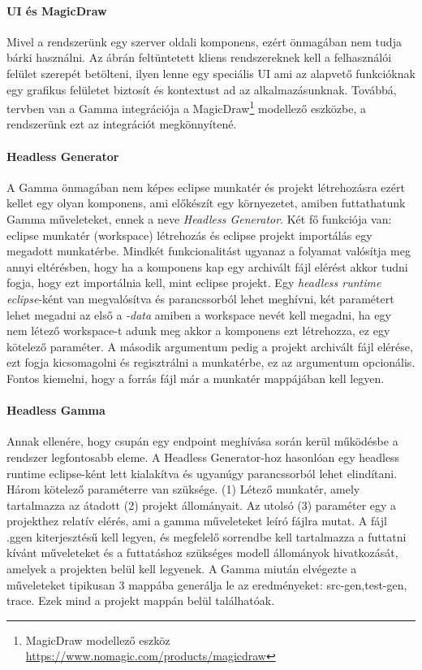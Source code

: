 \paragraph{UI és MagicDraw} Mivel a rendszerünk egy szerver oldali komponens, ezért önmagában nem tudja bárki használni. Az ábrán feltüntetett kliens rendszereknek kell a felhasználói felület szerepét betölteni, ilyen lenne egy speciális UI ami az alapvető funkcióknak egy grafikus felületet biztosít és kontextust ad az alkalmazásunknak. Továbbá, tervben van a Gamma integrációja a MagicDraw\footnote{MagicDraw modellező eszköz \url{https://www.nomagic.com/products/magicdraw}} modellező eszközbe, a rendszerünk ezt az integrációt megkönnyítené. 

\paragraph{Headless Generator} A Gamma önmagában nem képes eclipse munkatér és projekt létrehozásra ezért kellet egy olyan komponens, ami előkészít egy környezetet, amiben futtathatunk Gamma műveleteket, ennek a neve \textit{Headless Generator}. Két fő funkciója van: eclipse munkatér (workspace) létrehozás és eclipse projekt importálás egy megadott munkatérbe. Mindkét funkcionalitást ugyanaz a folyamat valósítja meg annyi eltérésben, hogy ha a komponens kap egy archivált fájl elérést akkor tudni fogja, hogy ezt importálnia kell, mint eclipse projekt.  Egy \textit{headless runtime eclipse}-ként van megvalósítva és parancssorból lehet meghívni, két paramétert lehet megadni az első a \textit{-data} amiben a workspace nevét kell megadni, ha egy nem létező workspace-t adunk meg akkor a komponens ezt létrehozza, ez egy kötelező paraméter. A második argumentum pedig a projekt archivált fájl elérése, ezt fogja kicsomagolni és regisztrálni a munkatérbe, ez az argumentum opcionális. Fontos kiemelni, hogy a forrás fájl már a munkatér mappájában kell legyen.

\paragraph{Headless Gamma} Annak ellenére, hogy csupán egy endpoint meghívása során kerül működésbe a rendszer legfontosabb eleme. A Headless Generator-hoz hasonlóan egy headless runtime eclipse-ként lett kialakítva és ugyanúgy parancssorból lehet elindítani. Három kötelező paraméterre van szüksége. (1) Létező munkatér, amely tartalmazza az átadott (2) projekt állományait. Az utolsó (3) paraméter egy a projekthez relatív elérés, ami a gamma műveleteket leíró fájlra mutat. A fájl .ggen kiterjesztésű kell legyen, és megfelelő sorrendbe kell tartalmazza a futtatni kívánt műveleteket és a futtatáshoz szükséges modell állományok hivatkozását, amelyek a projekten belül kell legyenek. A Gamma miután elvégezte a műveleteket tipikusan 3 mappába generálja le az eredményeket: src-gen,test-gen, trace. Ezek mind a projekt mappán belül találhatóak. 

